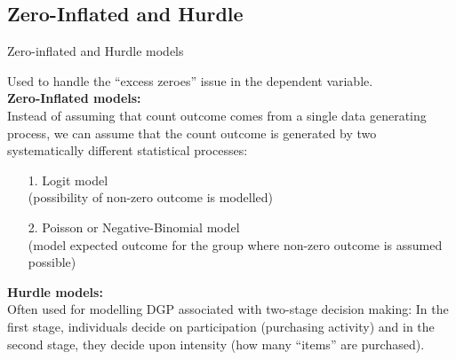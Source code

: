 \documentclass[usenames,dvipsnames]{beamer}
\begin{document}
\subsection{Zero-Inflated and Hurdle}
\begin{frame}{Zero-inflated and Hurdle models}

{\small
Used to handle the “excess zeroes” issue in the dependent variable. \\
\bigskip
\textbf{Zero-Inflated models:}\\
Instead of assuming that count outcome comes from a single data generating process, we can assume that the count outcome is generated by two systematically different statistical processes:
\begin{itemize}
\item[1.] Logit model \\
(possibility of non-zero outcome is modelled)
\item[2.] Poisson or Negative-Binomial model \\
(model expected outcome for the group where non-zero outcome is assumed possible)
\end{itemize}
\bigskip
\textbf{Hurdle models:}\\
Often used for modelling DGP associated with two-stage decision making: In the first stage, individuals decide on participation (purchasing activity) and in the second stage, they decide upon intensity (how many ``items'' are purchased).
}
\end{frame}
\end{document}
